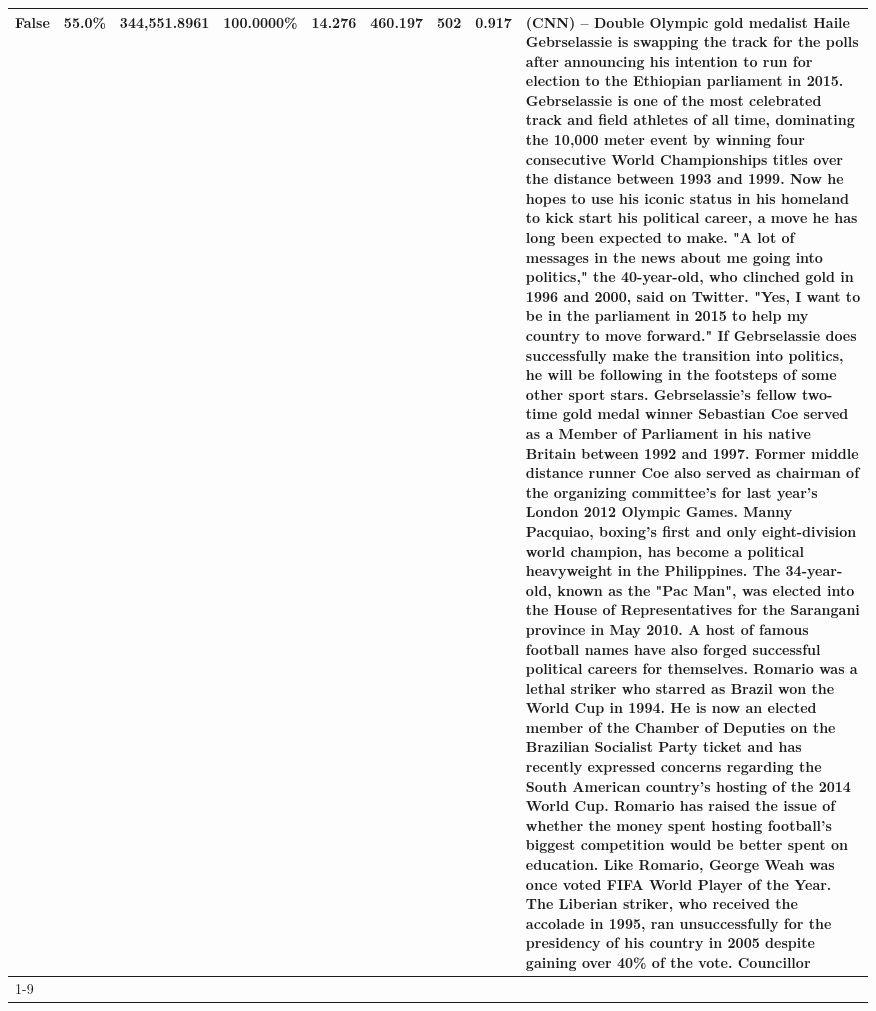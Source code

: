 \begin{table}[H]
{\begin{tabular}{lllrlllll}
False & 55.0\% & 344,551.8961 & \bfseries \color{red} 100.0000\% & 14.276 & 460.197 & 502 & 0.917 & (CNN) -- Double Olympic gold medalist Haile Gebrselassie is swapping the track for the polls after announcing his intention to run for election to the Ethiopian parliament in 2015. Gebrselassie is one of the most celebrated track and field athletes of all time, dominating the 10,000 meter event by winning four consecutive World Championships titles over the distance between 1993 and 1999. Now he hopes to use his iconic status in his homeland to kick start his political career, a move he has long been expected to make. "A lot of messages in the news about me going into politics," the 40-year-old, who clinched gold in 1996 and 2000, said on Twitter. "Yes, I want to be in the parliament in 2015 to help my country to move forward." If Gebrselassie does successfully make the transition into politics, he will be following in the footsteps of some other sport stars. Gebrselassie's fellow two-time gold medal winner Sebastian Coe served as a Member of Parliament in his native Britain between 1992 and 1997. Former middle distance runner Coe also served as chairman of the organizing committee's for last year's London 2012 Olympic Games. Manny Pacquiao, boxing's first and only eight-division world champion, has become a political heavyweight in the Philippines. The 34-year-old, known as the "Pac Man", was elected into the House of Representatives for the Sarangani province in May 2010. A host of famous football names have also forged successful political careers for themselves. Romario was a lethal striker who starred as Brazil won the World Cup in 1994. He is now an elected member of the Chamber of Deputies on the Brazilian Socialist Party ticket and has recently expressed concerns regarding the South American country's hosting of the 2014 World Cup. Romario has raised the issue of whether the money spent hosting football's biggest competition would be better spent on education. Like Romario, George Weah was once voted FIFA World Player of the Year. The Liberian striker, who received the accolade in 1995, ran unsuccessfully for the presidency of his country in 2005 despite gaining over 40\% of the vote. Councillor \\
\cline{1-9}

\end{tabular}}
\end{table}
